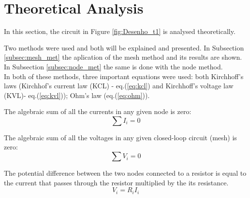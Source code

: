 
\section{Theoretical Analysis}
\label{sec:analysis}



In this section, the circuit in Figure \ref{fig:Desenho_t1} is analysed theoretically.

Two methods were used and both will be explained and presented. In Subsection \ref{subsec:mesh_met}
the aplication of the mesh method and its results are shown. In Subsection \ref{subsec:node_met} the
same is done with the node method. \\

In both of these methods, three important equations were used: both Kirchhoff's laws (Kirchhof's
current law (KCL) - eq.(\ref{eq:kcl}) and Kirchhoff's voltage law (KVL)- eq.(\ref{eq:kvl}));
Ohm's law (eq.(\ref{eq:ohm})).

The algebraic sum of all the currents in any given node is zero:
\begin{equation}
	\sum I_i = 0
	\label{eq:kcl}
\end{equation}

The algebraic sum of all the voltages in any given closed-loop circuit (mesh) is zero:
\begin{equation}
	\sum V_i = 0
	\label{eq:kvl}
\end{equation}

The potential difference between the two nodes connected to a resistor is equal to the current that 
passes through the resistor multiplied by the its resistance.
\begin{equation}
	V_i = R_iI_i
	\label{eq:ohm}
\end{equation}




